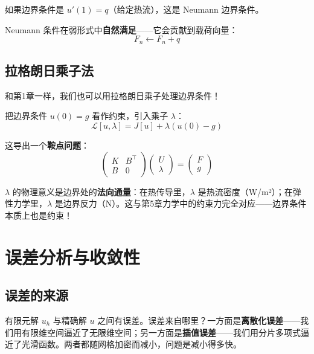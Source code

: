 如果边界条件是 $u'(1) = q$（给定热流），这是 Neumann 边界条件。

Neumann 条件在弱形式中\textbf{自然满足}——它会贡献到载荷向量：
\[
F_n \leftarrow F_n + q
\]

\subsection{拉格朗日乘子法}

和第1章一样，我们也可以用拉格朗日乘子处理边界条件！

把边界条件 $u(0) = g$ 看作约束，引入乘子 $\lambda$：
\[
\mathcal{L}[u, \lambda] = J[u] + \lambda(u(0) - g)
\]

这导出一个\textbf{鞍点问题}：
\[
\begin{pmatrix}
K & B^\top \\
B & 0
\end{pmatrix}
\begin{pmatrix}
U \\
\lambda
\end{pmatrix}
=
\begin{pmatrix}
F \\
g
\end{pmatrix}
\]

\begin{physicalmeaning}
$\lambda$ 的物理意义是边界处的\textbf{法向通量}：在热传导里，$\lambda$ 是热流密度（W/m²）；在弹性力学里，$\lambda$ 是边界反力（N）。这与第5章力学中的约束力完全对应——边界条件本质上也是约束！
\end{physicalmeaning}

\section{误差分析与收敛性}

\subsection{误差的来源}

有限元解 $u_h$ 与精确解 $u$ 之间有误差。误差来自哪里？一方面是\textbf{离散化误差}——我们用有限维空间逼近了无限维空间；另一方面是\textbf{插值误差}——我们用分片多项式逼近了光滑函数。两者都随网格加密而减小，问题是减小得多快。

